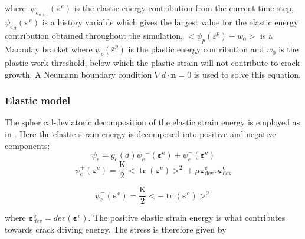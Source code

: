 \documentclass[sn-mathphys,Numbered,draft]{sn-jnl}%
\begin{document}
where ${\ \psi}_{e_{n+1}}\left(\mathbf{\varepsilon}^e\right)$ is the elastic energy contribution from the current time step, $\psi_{e_H}\left(\mathbf{\varepsilon}^e\right)$ is a history variable which gives the largest value for the elastic energy contribution obtained throughout the simulation, $<\psi_p\left({\bar{\varepsilon}}^p\right)-w_0>$ is a Macaulay bracket where $\psi_p\left({\bar{\varepsilon}}^p\right)$ is the plastic energy contribution and $w_0$ is the plastic work threshold, below which the plastic strain will not contribute to crack growth. 
A Neumann boundary condition $\nabla d\cdot\mathbf{n}=0$ is used to solve this equation.



\subsubsection{Elastic model}

The spherical-deviatoric decomposition of the elastic strain energy is employed as in \citet{amor_regularized_2009}. Here the elastic strain energy is decomposed into positive and negative components:
\begin{equation}
\psi_e=g_{\mathrm{e}}(d) \psi_e{ }^{+}\left(\boldsymbol{\varepsilon}^{\mathrm{e}}\right)+\psi_e^{-}\left(\boldsymbol{\varepsilon}^{\mathrm{e}}\right)
\end{equation}
\begin{equation}
    \psi_e^{+}\left(\boldsymbol{\varepsilon}^{\mathrm{e}}\right)=\frac{\mathrm{K}}{2}<\operatorname{tr}\left(\boldsymbol{\varepsilon}^{\mathrm{e}}\right)>^2+\mu \boldsymbol{\varepsilon}_{\mathrm{dev}}^{\mathrm{e}}: \boldsymbol{\varepsilon}_{\mathrm{dev}}^{\mathrm{e}}
\end{equation}

\begin{equation}
    \psi_e^{-}\left(\boldsymbol{\varepsilon}^{\mathrm{e}}\right)=\frac{\mathrm{K}}{2}<-\operatorname{tr}\left(\boldsymbol{\varepsilon}^{\mathrm{e}}\right)>^2
\end{equation}

where $\boldsymbol{\varepsilon}_{dev}^{\mathrm{e}}=dev({\boldsymbol{\varepsilon}}^e)$. The positive elastic strain energy is what contributes towards crack driving energy. The stress is therefore given by
\end{document}
